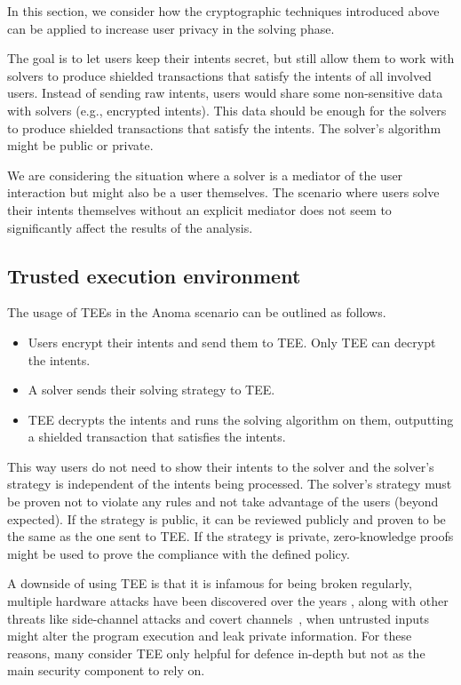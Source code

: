 \documentclass[
    9pt,            %
    report,        %
    affiltop,       %
]{art}
\begin{document}
In this section, we consider how the cryptographic techniques introduced above can be applied to increase user privacy in the solving phase.

The goal is to let users keep their intents secret, but still allow them to work with solvers to produce shielded transactions that satisfy the intents of all involved users. Instead of sending raw intents, users would share some non-sensitive data with solvers (e.g., encrypted intents). This data should be enough for the solvers to produce shielded transactions that satisfy the intents. The solver's algorithm might be public or private. 

We are considering the situation where a solver is a mediator of the user interaction but might also be a user themselves. The scenario where users solve their intents themselves without an explicit mediator does not seem to significantly affect the results of the analysis.

\subsection{Trusted execution environment}\label{TEE-expanded}

The usage of TEEs in the Anoma scenario can be outlined as follows.

\begin{itemize}
    \item Users encrypt their intents and send them to TEE. Only TEE can decrypt the intents.
    \item A solver sends their solving strategy to TEE.
    \item TEE decrypts the intents and runs the solving algorithm on them, outputting a shielded transaction that satisfies the intents.
\end{itemize}

This way users do not need to show their intents to the solver and the solver's strategy is independent of the intents being processed. The solver's strategy must be proven not to violate any rules and not take advantage of the users (beyond expected). If the strategy is public, it can be reviewed publicly and proven to be the same as the one sent to TEE. If the strategy is private, zero-knowledge proofs might be used to prove the compliance with the defined policy.

A downside of using TEE is that it is infamous for being broken regularly,
multiple hardware attacks have been discovered over the years
\citep{sgxfail,downfall}, along with other threats like side-channel attacks and
covert channels~\citep{flash}, when untrusted inputs might alter the program
execution and leak private information. For these reasons, many consider TEE
only helpful for defence in-depth but not as the main security component to rely
on.
\end{document}
